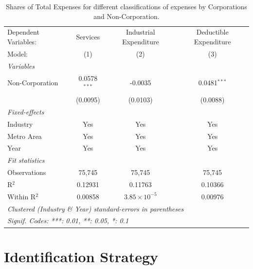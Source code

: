 \documentclass[
  12pt]{article}
\begin{document}
\begin{table}

\caption{\label{tbl-reg-shares-3}Shares of Total Expenses for different
classifications of expenses by Corporations and Non-Corporation.}

\begin{minipage}{\linewidth}

\begingroup
\centering
\begin{tabular}{lccc}
   \tabularnewline \midrule \midrule
   Dependent Variables: & Services       & Industrial Expenditure & Deductible Expenditure\\  
   Model:               & (1)            & (2)                    & (3)\\  
   \midrule
   \emph{Variables}\\
   Non-Corporation      & 0.0578$^{***}$ & -0.0035                & 0.0481$^{***}$\\   
                        & (0.0095)       & (0.0103)               & (0.0088)\\   
   \midrule
   \emph{Fixed-effects}\\
   Industry             & Yes            & Yes                    & Yes\\  
   Metro Area           & Yes            & Yes                    & Yes\\  
   Year                 & Yes            & Yes                    & Yes\\  
   \midrule
   \emph{Fit statistics}\\
   Observations         & 75,745         & 75,745                 & 75,745\\  
   R$^2$                & 0.12931        & 0.11763                & 0.10366\\  
   Within R$^2$         & 0.00858        & $3.85\times 10^{-5}$   & 0.00976\\  
   \midrule \midrule
   \multicolumn{4}{l}{\emph{Clustered (Industry \& Year) standard-errors in parentheses}}\\
   \multicolumn{4}{l}{\emph{Signif. Codes: ***: 0.01, **: 0.05, *: 0.1}}\\
\end{tabular}
\par\endgroup

\end{minipage}%

\end{table}%

\section{Identification Strategy}\label{identification-strategy}
\end{document}
